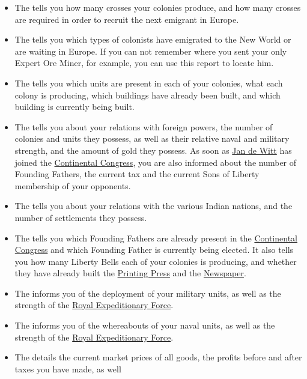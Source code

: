 \documentclass[12pt]{book}
\begin{document}
\begin{itemize}
\item The  tells you how many crosses your
colonies produce, and how many crosses are required in order to
recruit the next emigrant in Europe.
\item The  tells you which types of colonists
have emigrated to the New World or are waiting in Europe. If you can
not remember where you sent your only Expert Ore Miner, for example,
you can use this report to locate him.
\item The  tells you which units are present in
each of your colonies, what each colony is producing, which buildings
have already been built, and which building is currently being built.
\item The  tells you about your
  relations with foreign powers, the number of colonies and units they
  possess, as well as their relative naval and military strength, and
  the amount of gold they possess. As soon as \hyperlink{Jan de
    Witt}{Jan de Witt} has joined the \hyperlink{Continental
    Congress}{Continental Congress}, you are also informed about the
  number of Founding Fathers, the current tax and the current Sons of
  Liberty membership of your opponents.
\item The  tells you about your relations with
the various Indian nations, and the number of settlements they
possess.
\item The  tells you which
Founding Fathers are already present in the \hyperlink{Continental
Congress}{Continental Congress} and which Founding Father is currently
being elected. It also tells you how many Liberty Bells each of your
colonies is producing, and whether they have already built the
\hyperlink{Printing Press}{Printing Press} and the
\hyperlink{Newspaper}{Newspaper}.
\item The  informs you of the deployment of
your military units, as well as the strength of the \hyperlink{Royal
Expeditionary Force}{Royal Expeditionary Force}.
\item The  informs you of the whereabouts of
your naval units, as well as the strength of the \hyperlink{Royal
Expeditionary Force}{Royal Expeditionary Force}.
\item The  details the current market prices of
all goods, the profits before and after taxes you have made, as well

\end{itemize}
\end{document}
